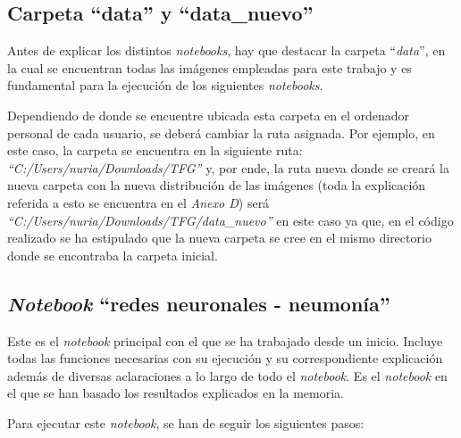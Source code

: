 \subsection{Carpeta ``data'' y ``data\_nuevo''}

Antes de explicar los distintos \textit{notebooks}, hay que destacar la carpeta ``\textit{data}'', en la cual se encuentran todas las imágenes empleadas para este trabajo y es fundamental para la ejecución de los siguientes \textit{notebooks}.

Dependiendo de donde se encuentre ubicada esta carpeta en el ordenador personal de cada usuario, se deberá cambiar la ruta asignada. Por ejemplo, en este caso, la carpeta se encuentra en la siguiente ruta: \textit{``C:/Users/nuria/Downloads/TFG''} y, por ende, la ruta nueva donde se creará la nueva carpeta con la nueva distribución de las imágenes (toda la explicación referida a esto se encuentra en el \textit{Anexo D}) será \textit{``C:/Users/nuria/Downloads/TFG/data\_nuevo''} en este caso ya que, en el código realizado se ha estipulado que la nueva carpeta se cree en el mismo directorio donde se encontraba la carpeta inicial.

\subsection{\textit{Notebook} ``redes neuronales - neumonía''}

Este es el \textit{notebook} principal con el que se ha trabajado desde un inicio. Incluye todas las funciones necesarias con su ejecución y su correspondiente explicación además de diversas aclaraciones a lo largo de todo el \textit{notebook}. Es el \textit{notebook} en el que se han basado los resultados explicados en la memoria.

Para ejecutar este \textit{notebook}, se han de seguir los siguientes pasos:

